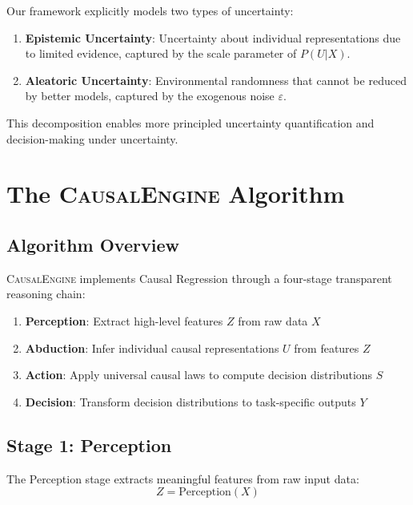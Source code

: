 \documentclass[conference]{IEEEtran}
\newcommand{\causalengine}{\textsc{CausalEngine}}
\begin{document}
Our framework explicitly models two types of uncertainty:

\begin{enumerate}
\item \textbf{Epistemic Uncertainty}: Uncertainty about individual representations due to limited evidence, captured by the scale parameter of $P(U|X)$.

\item \textbf{Aleatoric Uncertainty}: Environmental randomness that cannot be reduced by better models, captured by the exogenous noise $\varepsilon$.
\end{enumerate}

This decomposition enables more principled uncertainty quantification and decision-making under uncertainty.

\section{The \causalengine{} Algorithm}
\label{sec:algorithm}

\subsection{Algorithm Overview}

\causalengine{} implements Causal Regression through a four-stage transparent reasoning chain:

\begin{enumerate}
\item \textbf{Perception}: Extract high-level features $Z$ from raw data $X$
\item \textbf{Abduction}: Infer individual causal representations $U$ from features $Z$
\item \textbf{Action}: Apply universal causal laws to compute decision distributions $S$
\item \textbf{Decision}: Transform decision distributions to task-specific outputs $Y$
\end{enumerate}

\subsection{Stage 1: Perception}

The Perception stage extracts meaningful features from raw input data:
\begin{equation}
Z = \text{Perception}(X)
\end{equation}
\end{document}

